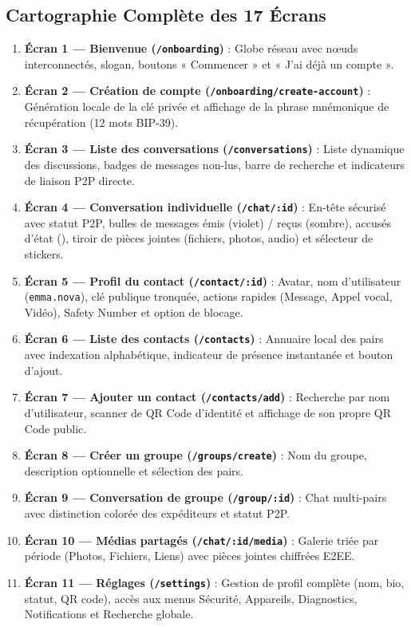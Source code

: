 \documentclass[11pt,a4paper]{article}
\begin{document}
\subsection{Cartographie Complète des 17 Écrans}
\begin{enumerate}
    \item \textbf{Écran 1 — Bienvenue (\texttt{/onboarding})} : Globe réseau avec nœuds interconnectés, slogan, boutons « Commencer » et « J'ai déjà un compte ».
    \item \textbf{Écran 2 — Création de compte (\texttt{/onboarding/create-account})} : Génération locale de la clé privée et affichage de la phrase mnémonique de récupération (12 mots BIP-39).
    \item \textbf{Écran 3 — Liste des conversations (\texttt{/conversations})} : Liste dynamique des discussions, badges de messages non-lus, barre de recherche et indicateurs de liaison P2P directe.
    \item \textbf{Écran 4 — Conversation individuelle (\texttt{/chat/:id})} : En-tête sécurisé avec statut P2P, bulles de messages émis (violet) / reçus (sombre), accusés d'état (\checkmark\checkmark), tiroir de pièces jointes (fichiers, photos, audio) et sélecteur de stickers.
    \item \textbf{Écran 5 — Profil du contact (\texttt{/contact/:id})} : Avatar, nom d'utilisateur (\texttt{emma.nova}), clé publique tronquée, actions rapides (Message, Appel vocal, Vidéo), Safety Number et option de blocage.
    \item \textbf{Écran 6 — Liste des contacts (\texttt{/contacts})} : Annuaire local des pairs avec indexation alphabétique, indicateur de présence instantanée et bouton d'ajout.
    \item \textbf{Écran 7 — Ajouter un contact (\texttt{/contacts/add})} : Recherche par nom d'utilisateur, scanner de QR Code d'identité et affichage de son propre QR Code public.
    \item \textbf{Écran 8 — Créer un groupe (\texttt{/groups/create})} : Nom du groupe, description optionnelle et sélection des pairs.
    \item \textbf{Écran 9 — Conversation de groupe (\texttt{/group/:id})} : Chat multi-pairs avec distinction colorée des expéditeurs et statut P2P.
    \item \textbf{Écran 10 — Médias partagés (\texttt{/chat/:id/media})} : Galerie triée par période (Photos, Fichiers, Liens) avec pièces jointes chiffrées E2EE.
    \item \textbf{Écran 11 — Réglages (\texttt{/settings})} : Gestion de profil complète (nom, bio, statut, QR code), accès aux menus Sécurité, Appareils, Diagnostics, Notifications et Recherche globale.

\end{enumerate}
\end{document}
